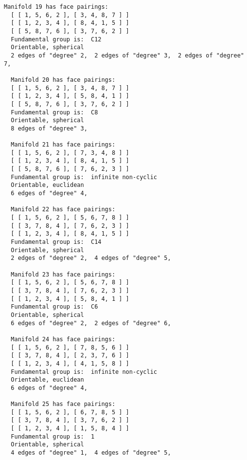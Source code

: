 \documentclass[a4paper,11pt]{report}
\begin{document}
{{{\begin{Verbatim}[commandchars=@|A,fontsize=\small,frame=single,label=Example]
  Manifold 19 has face pairings:
  [ [ 1, 5, 6, 2 ], [ 3, 4, 8, 7 ] ]
  [ [ 1, 2, 3, 4 ], [ 8, 4, 1, 5 ] ]
  [ [ 5, 8, 7, 6 ], [ 3, 7, 6, 2 ] ]
  Fundamental group is:  C12
  Orientable, spherical
  2 edges of "degree" 2,  2 edges of "degree" 3,  2 edges of "degree" 7,  
  
  Manifold 20 has face pairings:
  [ [ 1, 5, 6, 2 ], [ 3, 4, 8, 7 ] ]
  [ [ 1, 2, 3, 4 ], [ 5, 8, 4, 1 ] ]
  [ [ 5, 8, 7, 6 ], [ 3, 7, 6, 2 ] ]
  Fundamental group is:  C8
  Orientable, spherical
  8 edges of "degree" 3,  
  
  Manifold 21 has face pairings:
  [ [ 1, 5, 6, 2 ], [ 7, 3, 4, 8 ] ]
  [ [ 1, 2, 3, 4 ], [ 8, 4, 1, 5 ] ]
  [ [ 5, 8, 7, 6 ], [ 7, 6, 2, 3 ] ]
  Fundamental group is:  infinite non-cyclic
  Orientable, euclidean
  6 edges of "degree" 4,  
  
  Manifold 22 has face pairings:
  [ [ 1, 5, 6, 2 ], [ 5, 6, 7, 8 ] ]
  [ [ 3, 7, 8, 4 ], [ 7, 6, 2, 3 ] ]
  [ [ 1, 2, 3, 4 ], [ 8, 4, 1, 5 ] ]
  Fundamental group is:  C14
  Orientable, spherical
  2 edges of "degree" 2,  4 edges of "degree" 5,  
  
  Manifold 23 has face pairings:
  [ [ 1, 5, 6, 2 ], [ 5, 6, 7, 8 ] ]
  [ [ 3, 7, 8, 4 ], [ 7, 6, 2, 3 ] ]
  [ [ 1, 2, 3, 4 ], [ 5, 8, 4, 1 ] ]
  Fundamental group is:  C6
  Orientable, spherical
  6 edges of "degree" 2,  2 edges of "degree" 6,  
  
  Manifold 24 has face pairings:
  [ [ 1, 5, 6, 2 ], [ 7, 8, 5, 6 ] ]
  [ [ 3, 7, 8, 4 ], [ 2, 3, 7, 6 ] ]
  [ [ 1, 2, 3, 4 ], [ 4, 1, 5, 8 ] ]
  Fundamental group is:  infinite non-cyclic
  Orientable, euclidean
  6 edges of "degree" 4,  
  
  Manifold 25 has face pairings:
  [ [ 1, 5, 6, 2 ], [ 6, 7, 8, 5 ] ]
  [ [ 3, 7, 8, 4 ], [ 3, 7, 6, 2 ] ]
  [ [ 1, 2, 3, 4 ], [ 1, 5, 8, 4 ] ]
  Fundamental group is:  1
  Orientable, spherical
  4 edges of "degree" 1,  4 edges of "degree" 5,
  
\end{Verbatim}
 }

 
}}
\end{document}
